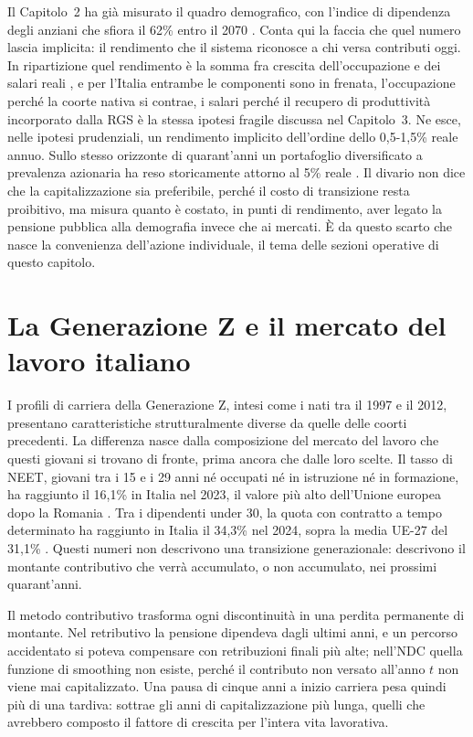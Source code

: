 \noindent
Il Capitolo~2 ha già misurato il quadro demografico, con l'indice di dipendenza
degli anziani che sfiora il 62\% entro il 2070 \cite{MEF_RGS2025}. Conta qui la
faccia che quel numero lascia implicita: il rendimento che il sistema riconosce a
chi versa contributi oggi. In ripartizione quel rendimento è la somma fra crescita
dell'occupazione e dei salari reali \cite{Bosi2018}, e per l'Italia entrambe le
componenti sono in frenata, l'occupazione perché la coorte nativa si contrae, i
salari perché il recupero di produttività incorporato dalla RGS è la stessa ipotesi
fragile discussa nel Capitolo~3. Ne esce, nelle ipotesi prudenziali, un rendimento
implicito dell'ordine dello 0,5-1,5\% reale annuo. Sullo stesso orizzonte di
quarant'anni un portafoglio diversificato a prevalenza azionaria ha reso
storicamente attorno al 5\% reale \cite{DimsonMarshStaunton2025}. Il divario non
dice che la capitalizzazione sia preferibile, perché il costo di transizione resta
proibitivo, ma misura quanto è costato, in punti di rendimento, aver legato la
pensione pubblica alla demografia invece che ai mercati. È da questo scarto che
nasce la convenienza dell'azione individuale, il tema delle sezioni operative di
questo capitolo.

\section{La Generazione Z e il mercato del lavoro italiano}
\label{sec:genz}

\noindent
I profili di carriera della Generazione Z, intesi come i nati tra il 1997
e il 2012, presentano caratteristiche strutturalmente diverse da quelle
delle coorti precedenti. La differenza nasce dalla composizione del mercato
del lavoro che questi giovani si trovano di fronte, prima ancora che dalle
loro scelte. Il tasso di NEET, giovani tra i 15
e i 29 anni né occupati né in istruzione né in formazione, ha raggiunto
il 16,1\% in Italia nel 2023, il valore più alto dell'Unione europea
dopo la Romania \cite{EUROSTAT_NEET2024}. Tra i dipendenti
under 30, la quota con contratto a tempo determinato ha raggiunto in Italia
il 34,3\% nel 2024, sopra la media UE-27 del 31,1\% \cite{EUROSTAT_LFS_temporary2024}. Questi numeri
non descrivono una transizione generazionale: descrivono il montante
contributivo che verrà accumulato, o non accumulato, nei prossimi
quarant'anni.

\medskip
\noindent
Il metodo contributivo trasforma ogni discontinuità in una perdita permanente di
montante. Nel retributivo la pensione dipendeva dagli ultimi anni, e un percorso
accidentato si poteva compensare con retribuzioni finali più alte; nell'NDC quella
funzione di smoothing non esiste, perché il contributo non versato all'anno $t$ non
viene mai capitalizzato. Una pausa di cinque anni a inizio carriera pesa quindi più
di una tardiva: sottrae gli anni di capitalizzazione più lunga, quelli che avrebbero
composto il fattore di crescita per l'intera vita lavorativa.

